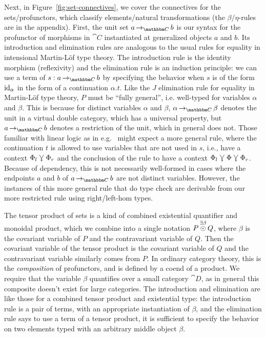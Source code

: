 \documentclass{llncs}
\begin{document}
Next, in Figure~\ref{fig:set-connectives}, we cover the connectives for
the sets/profunctors, which classify elements/natural transformations
(the $\beta/\eta$-rules are in the appendix).
First, the unit set $\punitinXfromYtoZ {\cat C} a b$ is our syntax for
the profunctor of morphisms in $\cat C$ instantiated at generalized
objects $a$ and $b$.
%
Its introduction and elimination rules are analogous to the usual
rules for equality in intensional Martin-L\"of type theory.  The
introduction rule is the identity morphism (reflexivity) and the
elimination rule is an induction principle: we can use a term of $s :
\punitinXfromYtoZ {\cat C} a b$ by specifying the behavior when $s$ is
of the form $\textrm{id}_{\alpha}$ in the form of a continuation
$\alpha. t$.  Like the $J$ elimination rule for equality in
Martin-L\"of type theory, $P$ must be ``fully general'',
i.e. well-typed for variables $\alpha$ and $\beta$. This is because
for distinct variables $\alpha$ and $\beta$, $\punitinXfromYtoZ{\cat
  C}{\alpha}{\beta}$ denotes the unit in a virtual double category,
which has a universal property, but $\punitinXfromYtoZ{\cat C} a b$
denotes a restriction of the unit, which in general does not.  Those
familiar with linear logic as in e.g.~\cite{polakow-pfenning} might
expect a more general rule, where the continuation $t$ is allowed to
use variables that are not used in $s$, i.e., have a context $\Phi_l
\curlyveedownarrow \Phi_r$ and the conclusion of the rule to have a context
$\Phi_l \curlyveedownarrow \Phi \curlyveedownarrow \Phi_r$. Because of dependency, this is not
necessarily well-formed in cases where the endpoints $a$ and $b$ of
$\punitinXfromYtoZ{\cat C} a b$ are not distinct variables.  However,
the instances of this more general rule that do type check are
derivable from our more restricted rule using right/left-hom types.

The tensor product of sets is a kind of combined existential quantifier
and monoidal product, which we combine into a single notation
$P \mathop{\overset{\exists \beta}\odot} Q$, where $\beta$ is the covariant
variable of $P$ and the contravariant variable of $Q$. Then the
covariant variable of the tensor product is the covariant variable of
$Q$ and the contravariant variable similarly comes from $P$.
%
In ordinary category theory, this is the \emph{composition} of
profunctors, and is defined by a coend of a product. We require that
the variable $\beta$ quantifies over a small category $\cat D$, as in
general this composite doesn't exist for large categories.
%
The introduction and elimination are like those for a combined tensor
product and existential type: the introduction rule is a pair of
terms, with an appropriate instantiation of $\beta$, and the
elimination rule says to use a term of a tensor product, it is
sufficient to specify the behavior on two elements typed with an
arbitrary middle object $\beta$.
\end{document}
